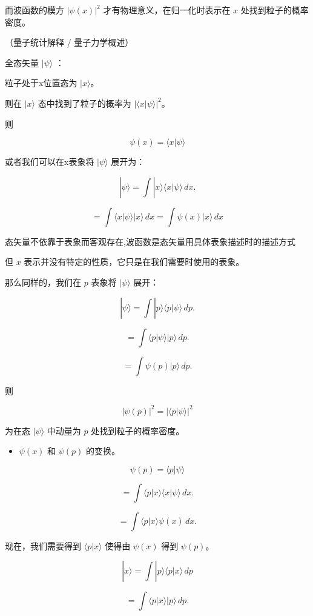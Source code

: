 \documentclass[lang=cn,10pt]{elegantbook}
\begin{document}
而波函数的模方 $|\psi(x)|^2$ 才有物理意义，在归一化时表示在 $x$ 处找到粒子的概率密度。

（量子统计解释 / 量子力学概述）

全态矢量 $| \psi \rangle$ ：

	粒子处于x位置态为 $| x \rangle$。

则在 $| x \rangle$ 态中找到了粒子的概率为 $|\langle x | \psi \rangle|^2$。

则 

\[
\psi(x) = \langle x | \psi \rangle
\]

或者我们可以在x表象将 $| \psi \rangle$ 展开为：

\[
| \psi \rangle = \int | x \rangle \langle x | \psi \rangle \, dx.
\]

\[
= \int \langle x | \psi \rangle | x \rangle \, dx=\int  \psi(x)  | x \rangle \, dx
\]

	态矢量不依靠于表象而客观存在,波函数是态矢量用具体表象描述时的描述方式

但 $x$ 表示并没有特定的性质，它只是在我们需要时使用的表象。

	那么同样的，我们在 $p$ 表象将 $| \psi \rangle$ 展开：

\[
| \psi \rangle = \int | p \rangle \langle p | \psi \rangle \, dp.
\]

\[
= \int \langle p | \psi \rangle | p \rangle \, dp.
\]

\[
= \int \psi(p) | p \rangle \, dp.
\]

则 

\[
|\psi(p)|^2 = |\langle p | \psi \rangle|^2
\]

	为在态 $| \psi \rangle$ 中动量为 $p$ 处找到粒子的概率密度。

\begin{itemize}
	\item $\psi(x)$ 和 $\psi(p)$ 的变换。
\end{itemize}

\[
\psi(p) = \langle p | \psi \rangle
\]

\[
= \int \langle p | x \rangle \langle x | \psi \rangle \, dx.
\]

\[
= \int \langle p | x \rangle \psi(x) \, dx.
\]

现在，我们需要得到 $\langle p | x \rangle$ 使得由 $\psi(x)$ 得到 $\psi(p)$。

\[
	| x \rangle = \int | p \rangle \langle p | x \rangle \, dp
\]

\[
	= \int \langle p | x \rangle | p \rangle \, dp.
\]

\end{document}
